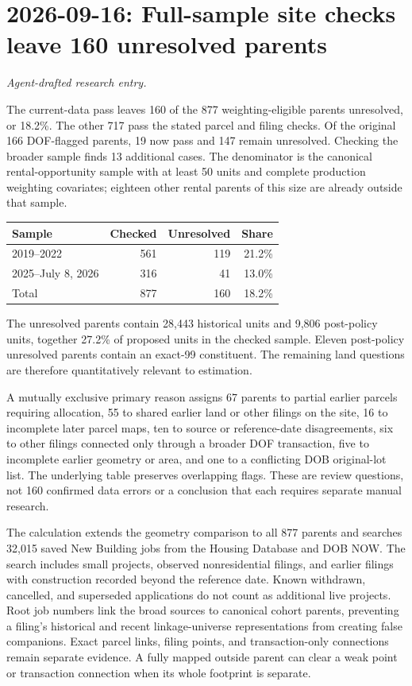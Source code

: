 \clearpage
\section*{2026-09-16: Full-sample site checks leave 160 unresolved parents}
\textit{Agent-drafted research entry.}

The current-data pass leaves 160 of the 877 weighting-eligible parents
unresolved, or 18.2\%. The other 717 pass the stated parcel and filing checks.
Of the original 166 DOF-flagged parents, 19 now pass and 147 remain unresolved.
Checking the broader sample finds 13 additional cases. The denominator is the
canonical rental-opportunity sample with at least 50 units and complete
production weighting covariates; eighteen other rental parents of this size
are already outside that sample.

\begin{center}
\begin{tabular}{lrrr}
\hline
Sample & Checked & Unresolved & Share \\
\hline
2019--2022 & 561 & 119 & 21.2\% \\
2025--July 8, 2026 & 316 & 41 & 13.0\% \\
Total & 877 & 160 & 18.2\% \\
\hline
\end{tabular}
\end{center}

The unresolved parents contain 28,443 historical units and 9,806 post-policy
units, together 27.2\% of proposed units in the checked sample. Eleven
post-policy unresolved parents contain an exact-99 constituent. The remaining
land questions are therefore quantitatively relevant to estimation.

A mutually exclusive primary reason assigns 67 parents to partial earlier
parcels requiring allocation, 55 to shared earlier land or other filings on
the site, 16 to incomplete later parcel maps, ten to source or reference-date
disagreements, six to other filings connected only through a broader DOF
transaction, five to incomplete earlier geometry or area, and one to a
conflicting DOB original-lot list. The underlying table preserves overlapping
flags. These are review questions, not 160 confirmed data errors or a conclusion
that each requires separate manual research.

The calculation extends the geometry comparison to all 877 parents and searches
32,015 saved New Building jobs from the Housing Database and DOB NOW. The
search includes small projects, observed nonresidential filings, and earlier
filings with construction recorded beyond the reference date. Known withdrawn,
cancelled, and superseded applications do not count as additional live projects.
Root job numbers link the broad sources to canonical cohort parents, preventing
a filing's historical and recent linkage-universe representations from creating
false companions. Exact parcel links, filing points, and transaction-only
connections remain separate evidence. A fully mapped outside parent can clear
a weak point or transaction connection when its whole footprint is separate.

